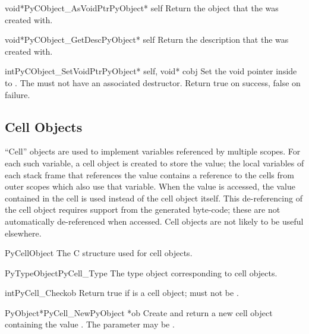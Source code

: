 \begin{cfuncdesc}{void*}{PyCObject_AsVoidPtr}{PyObject* self}
  Return the object  that the 
   was created with.
\end{cfuncdesc}

\begin{cfuncdesc}{void*}{PyCObject_GetDesc}{PyObject* self}
  Return the description  that the 
   was created with.
\end{cfuncdesc}

\begin{cfuncdesc}{int}{PyCObject_SetVoidPtr}{PyObject* self, void* cobj}
  Set the void pointer inside  to .
  The  must not have an associated destructor.
  Return true on success, false on failure.
\end{cfuncdesc}


\subsection{Cell Objects \label{cell-objects}}

``Cell'' objects are used to implement variables referenced by
multiple scopes.  For each such variable, a cell object is created to
store the value; the local variables of each stack frame that
references the value contains a reference to the cells from outer
scopes which also use that variable.  When the value is accessed, the
value contained in the cell is used instead of the cell object
itself.  This de-referencing of the cell object requires support from
the generated byte-code; these are not automatically de-referenced
when accessed.  Cell objects are not likely to be useful elsewhere.

\begin{ctypedesc}{PyCellObject}
  The C structure used for cell objects.
\end{ctypedesc}

\begin{cvardesc}{PyTypeObject}{PyCell_Type}
  The type object corresponding to cell objects.
\end{cvardesc}

\begin{cfuncdesc}{int}{PyCell_Check}{ob}
  Return true if  is a cell object;  must not be
  \NULL{}.
\end{cfuncdesc}

\begin{cfuncdesc}{PyObject*}{PyCell_New}{PyObject *ob}
  Create and return a new cell object containing the value .
  The parameter may be \NULL{}.
\end{cfuncdesc}


